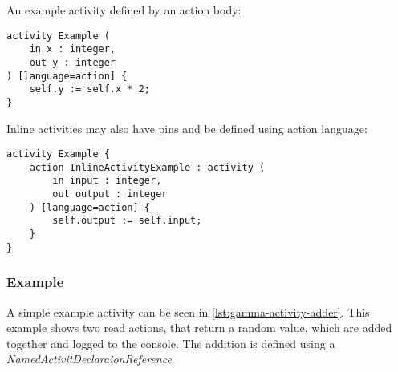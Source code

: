 An example activity defined by an action body:

\begin{lstlisting}[language=activity]
activity Example (
	in x : integer,
	out y : integer
) [language=action] {
	self.y := self.x * 2;
}
\end{lstlisting}

Inline activities may also have pins and be defined using action language:

\begin{lstlisting}[language=activity]
activity Example {
	action InlineActivityExample : activity (
		in input : integer,
		out output : integer
	) [language=action] {
		self.output := self.input;
	}
}
\end{lstlisting}

\subsubsection{Example}

A simple example activity can be seen in \autoref{lst:gamma-activity-adder}. This example shows two read actions, that return a random value, which are added together and logged to the console. The addition is defined using a \emph{NamedActivitDeclaraionReference}.


